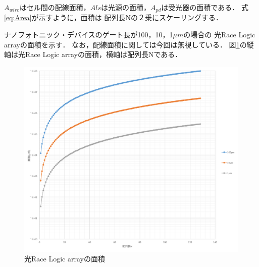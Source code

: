 $A_{wire}はセル間の配線面積，A{ls}は光源の面積，A_{pd}は受光器の面積である．$
式\ref{eq:Area}が示すように，面積は
配列長Nの２乗にスケーリングする．

ナノフォトニック・デバイスのゲート長が100，10，1$\mu m$の場合の
光Race Logic arrayの面積を示す．
なお，配線面積に関しては今回は無視している．
図\ref{fig:nanoArea}の縦軸は光Race Logic arrayの面積，横軸は配列長Nである．
\begin{figure}[t!]
\begin{center}
\includegraphics[keepaspectratio,scale=0.5]{fig/4/nanoArea.png}
\caption{光Race Logic arrayの面積}
\label{fig:nanoArea}
\end{center}
\end{figure}

